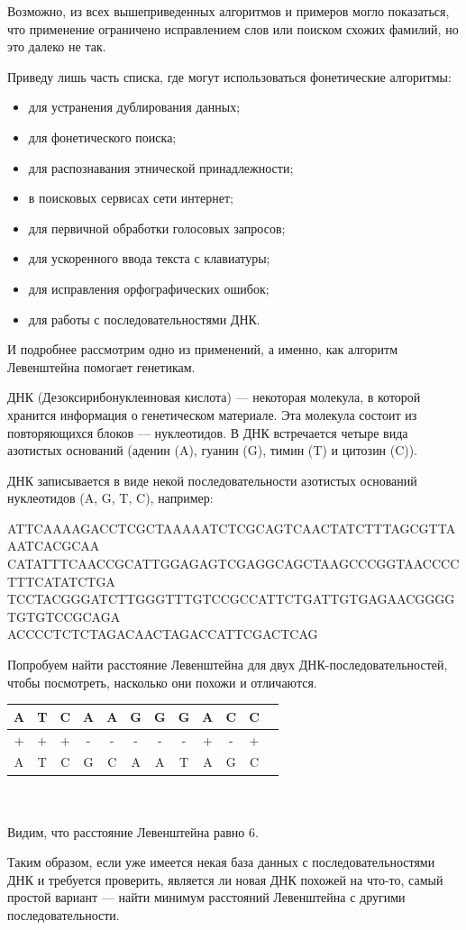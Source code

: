 \documentclass[titlepage,12pt]{article}
\begin{document}
Возможно, из всех вышеприведенных алгоритмов и примеров могло показаться, что применение ограничено исправлением слов или поиском схожих фамилий, но это далеко не так.

Приведу лишь часть списка, где могут использоваться фонетические алгоритмы:

\begin{itemize}
    \item для устранения дублирования данных;
    \item для фонетического поиска;
    \item для распознавания этнической принадлежности;
    \item в поисковых сервисах сети интернет;
    \item для первичной обработки голосовых запросов;
    \item для ускоренного ввода текста с клавиатуры;
    \item для исправления орфографических ошибок;
    \item для работы с последовательностями ДНК.
    
\end{itemize}

И подробнее рассмотрим одно из применений, а именно, как алгоритм Левенштейна помогает генетикам.

ДНК (Дезоксирибонуклеиновая кислота) --- некоторая молекула, в которой хранится информация о генетическом материале. Эта молекула состоит из повторяющихся блоков --- нуклеотидов. В ДНК встречается четыре вида азотистых оснований (аденин (A), гуанин (G), тимин (T) и цитозин (C)).

ДНК записывается в виде некой последовательности азотистых оснований нуклеотидов (A, G, T, C), например:

ATTCAAAAGACCTCGCTAAAAATCTCGCAGTCAACTATCTTTAGCGTTAAATCACGCAA\\CATATTTCAACCGCATTGGAGAGTCGAGGCAGCTAAGCCCGGTAACCCCTTTCATATCTGA\\TCCTACGGGATCTTGGGTTTGTCCGCCATTCTGATTGTGAGAACGGGGTGTGTCCGCAGA\\ACCCCTCTCTAGACAACTAGACCATTCGACTCAG

Попробуем найти расстояние Левенштейна для двух ДНК-последовательностей, чтобы посмотреть, насколько они похожи и отличаются.

\begin{tabular}{|c|c|c|c|c|c|c|c|c|c|c|c|}
    \hline
    A & T & C & A & A & G & G & G & A & C & C\\
    \hline
    + & + & + & - & - & - & - & - & + & - & +\\
    \hline
    A & T & C & G & C & A & A & T & A & G & C\\
    \hline
\end{tabular}
\\
\\
Видим, что расстояние Левенштейна равно 6. 

Таким образом, если уже имеется некая база данных с последовательностями ДНК и требуется проверить, является ли новая ДНК похожей на что-то, самый простой вариант --- найти минимум расстояний Левенштейна с другими последовательности.
\end{document}
